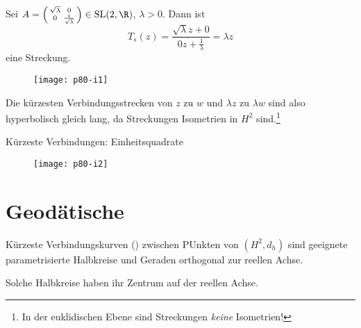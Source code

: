 \begin{remark}
  \
  \begin{enumerate}

    \begin{minipage}{.6\textwidth}
      \item Sei \( A = \left( \begin{smallmatrix}
        \sqrt{\lambda} & 0 \\ 0 & \frac{1}{\sqrt{\lambda}}
      \end{smallmatrix} \right) \in \text{SL}(2,\R) \), \( \lambda > 0 \). Dann ist
      \begin{equation*}
        T_s(z) = \frac{\sqrt{\lambda}z + 0}{0z + \frac{1}{\lambda}} = \lambda z
      \end{equation*}
      eine Streckung.
      \vspace{1em}
    \end{minipage}
    \hfill
    \begin{minipage}{.375\textwidth}
      \begin{figure}[H]
        \texttt{[image: p80-i1]}
      \end{figure}
    \end{minipage}
    Die kürzesten Verbindungsstrecken von \( z \) zu \( w \) und \( \lambda z \) zu \( \lambda w \) sind also hyperbolisch gleich lang, da Streckungen Isometrien in \( H^2 \) sind.\footnote{In der euklidischen Ebene sind Streckungen \emph{keine} Isometrien!}


    \item Kürzeste Verbindungen: Einheitsquadrate
    \begin{figure}[H]
      \texttt{[image: p80-i2]}
    \end{figure}
  \end{enumerate}
\end{remark}

\section{Geodätische}

\begin{theorem}[Geodätische]
  Kürzeste Verbindungskurven () zwischen PUnkten von \( (H^2, d_h) \) sind geeignete parametrisierte Halbkreise und Geraden orthogonal zur reellen Achse.

  Solche Halbkreise haben ihr Zentrum auf der reellen Achse.
\end{theorem}

